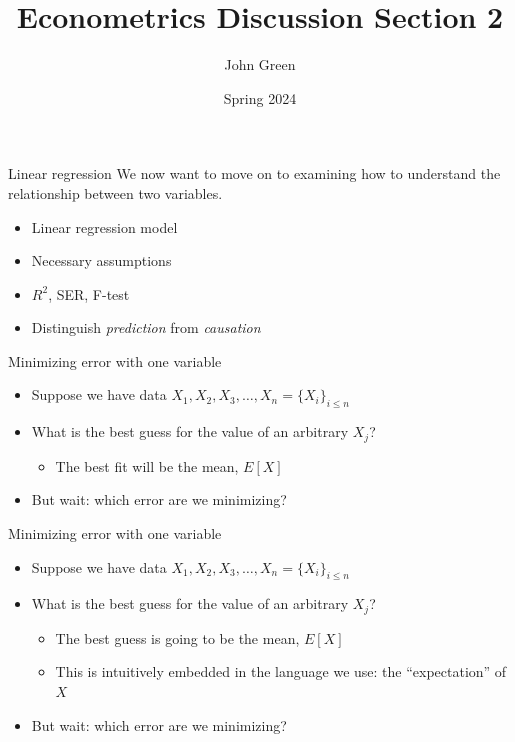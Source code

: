 \documentclass[aspectratio=169]{beamer}
\title{Econometrics Discussion Section 2}
\author{John Green}
\date{Spring 2024}
\begin{document}
\begin{frame}
    \titlepage 
\end{frame}

\begin{frame}{Linear regression}
    We now want to move on to examining how to understand the relationship between two variables.
    \begin{itemize}
        \item Linear regression model
        \item Necessary assumptions
        \item $R^2$, SER, F-test
        \item Distinguish \textit{prediction} from \textit{causation}
    \end{itemize}
\end{frame}

\begin{frame}{Minimizing error with one variable}
    \begin{itemize}
        \item Suppose we have data $X_1, X_2, X_3, \ldots, X_n = \{ X_i \}_{i \leq n} $
        \item What is the best guess for the value of an arbitrary $X_j$?
        \begin{itemize}
            \item The best fit will be the mean, $ E[X] $
        \end{itemize}
        \item But wait: which error are we minimizing?
    \end{itemize}
\end{frame}

\begin{frame}{Minimizing error with one variable}
    \begin{itemize}
        \item Suppose we have data $X_1, X_2, X_3, \ldots, X_n = \{ X_i \}_{i \leq n} $
        \item What is the best guess for the value of an arbitrary $X_j$?
        \begin{itemize}
            \item The best guess is going to be the mean, $ E[X] $
            \item This is intuitively embedded in the language we use: the ``expectation'' of $X$
        \end{itemize}
        \item But wait: which error are we minimizing?
    \end{itemize}
\end{frame}
\end{document}
